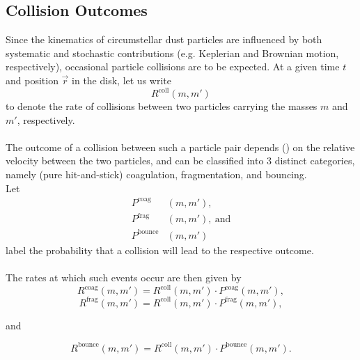    \subsection{Collision Outcomes}

        Since the kinematics of circumstellar dust particles are influenced by both systematic and 
        stochastic contributions (e.g. Keplerian and Brownian motion, respectively), occasional
        particle collisions are to be expected. At a given time $t$ and position $\vec r$ in the
        disk, let us write $$R^\text{coll}(m,m')$$ to denote the rate of collisions between two
        particles carrying the masses $m$ and $m'$, respectively. \\

         \\
        
        The outcome of a collision between such a particle pair depends ()
        on the relative velocity between the two particles, and can be classified into 3 distinct 
        categories, namely (pure hit-and-stick) coagulation, fragmentation, and bouncing.\\
        
        Let
        \begin{align*}
            P^\text{coag}&(m,m'),\\
            P^\text{frag}&(m,m'),\ \text{and}\\
            P^\text{bounce}&(m,m')
        \end{align*}
        label the probability that a collision will lead to the respective outcome. \\

         \\
        
        The rates at which such events occur are then given by
        \begin{equation}
            R^\text{coag}(m,m')
                =R^\text{coll}(m,m')\cdot P^\text{coag}(m,m'),
        \end{equation}
        \begin{equation}
            R^\text{frag}(m,m')
                =R^\text{coll}(m,m')\cdot P^\text{frag}(m,m'),
        \end{equation}
        \begin{center}and\end{center}
        \begin{equation}
            R^\text{bounce}(m,m')
                =R^\text{coll}(m,m')\cdot P^\text{bounce}(m,m').
        \end{equation}
        
